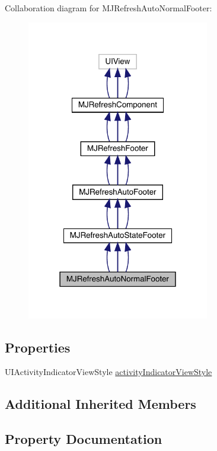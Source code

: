 Collaboration diagram for M\+J\+Refresh\+Auto\+Normal\+Footer\+:\nopagebreak
\begin{figure}[H]
\begin{center}
\leavevmode
\includegraphics[width=226pt]{interface_m_j_refresh_auto_normal_footer__coll__graph}
\end{center}
\end{figure}
\subsection*{Properties}
\begin{DoxyCompactItemize}
\item 
U\+I\+Activity\+Indicator\+View\+Style \mbox{\hyperlink{interface_m_j_refresh_auto_normal_footer_acb52c89b5d0eb64c08b8bd35899ae635}{activity\+Indicator\+View\+Style}}
\end{DoxyCompactItemize}
\subsection*{Additional Inherited Members}


\subsection{Property Documentation}
\mbox{\label{interface_m_j_refresh_auto_normal_footer_acb52c89b5d0eb64c08b8bd35899ae635}} 
